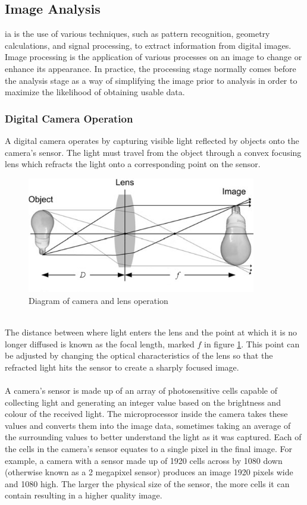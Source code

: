 \subsection{Image Analysis}
	\gls{ia} is the use of various techniques, such as pattern recognition, geometry calculations, and signal processing, to extract information from digital images. Image processing is the application of various processes on an image to change or enhance its appearance. In practice, the processing stage normally comes before the analysis stage as a way of simplifying the image prior to analysis in order to maximize the likelihood of obtaining usable data.
	\subsubsection{Digital Camera Operation}
		A digital camera operates by capturing visible light reflected by objects onto the camera’s sensor. The light must travel from the object through a convex focusing lens which refracts the light onto a corresponding point on the sensor.
		\begin{figure}[h!]
			\centering
			\includegraphics[width=10cm]{../images/camera_bulb.PNG}
			\caption[Diagram of camera and lens operation]{Diagram of camera and lens operation \citep{introtoprocessing}}
			\label{fig:camera_diagram}
		\end{figure}
		\\
		The distance between where light enters the lens and the point at which it is no longer diffused is known as the focal length, marked $f$ in figure \ref{fig:camera_diagram}. This point can be adjusted by changing the optical characteristics of the lens so that the refracted light hits the sensor to create a sharply focused image.
		\\\\
		A camera’s sensor is made up of an array of photosensitive cells capable of collecting light and generating an integer value based on the brightness and colour of the received light. The microprocessor inside the camera takes these values and converts them into the image data, sometimes taking an average of the surrounding values to better understand the light as it was captured. Each of the cells in the camera’s sensor equates to a single pixel in the final image. For example, a camera with a sensor made up of 1920 cells across by 1080 down (otherwise known as a 2 megapixel sensor) produces an image 1920 pixels wide and 1080 high. The larger the physical size of the sensor, the more cells it can contain resulting in a higher quality image.
